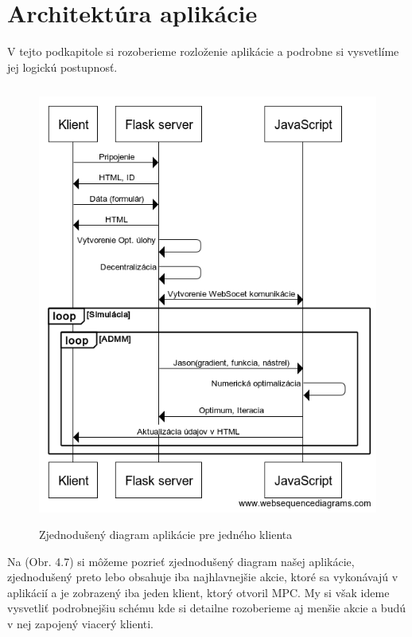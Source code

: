 \section{Architektúra aplikácie}
V tejto podkapitole si rozoberieme rozloženie aplikácie a podrobne si vysvetlíme jej logickú postupnosť.
\begin{figure}[H]	
	\centering
	\includegraphics[width=13cm,height=14.5cm]{images/Aplikacia}
	\caption{Zjednodušený diagram aplikácie pre jedného klienta}
\end{figure}
Na (Obr. 4.7) si môžeme pozrieť zjednodušený diagram našej aplikácie, zjednodušený preto lebo obsahuje iba najhlavnejšie akcie, ktoré sa vykonávajú v aplikácií a je zobrazený iba jeden klient, ktorý otvoril MPC. My si však ideme vysvetliť podrobnejšiu schému kde si detailne rozoberieme aj menšie akcie a budú v nej zapojený viacerý klienti.

